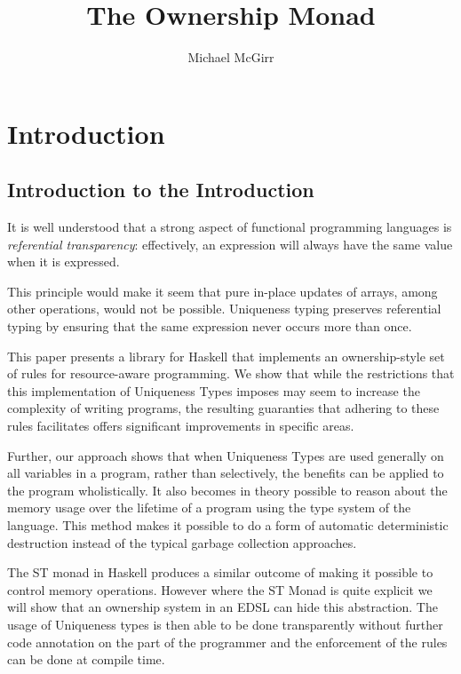 \documentclass[onehalf,11pt]{beavtex}
\title{The Ownership Monad}
\author{Michael McGirr}
\begin{document}
\maketitle

\mainmatter

\chapter{Introduction}
\section{Introduction to the Introduction}

It is well understood that a strong aspect of functional programming
languages is \textit{referential transparency}: effectively, an expression
will always have the same value when it is expressed. %

This principle would make it seem that pure in-place updates of arrays, among 
other operations, would not be possible. 
Uniqueness typing preserves referential typing by ensuring that the same
expression never occurs more than once.

This paper presents a library for Haskell that implements an
ownership-style set of rules for resource-aware programming.
We show that while the restrictions that this implementation of
Uniqueness Types imposes may seem to increase the complexity of
writing programs, the resulting guaranties that
adhering to these rules facilitates offers significant improvements in 
specific areas. 

Further, our approach shows that when Uniqueness Types are used generally
on all variables in a program, rather than selectively, the benefits can be
applied to the program wholistically.
It also becomes in theory possible to reason about the memory usage over the
lifetime of a program using the type system of the language. 
This method makes it possible to do a form of automatic deterministic destruction
instead of the typical garbage collection approaches.

The ST monad in Haskell produces a similar outcome of making it possible to
control memory operations.  However where the ST Monad is quite explicit
we will show that an ownership system in an EDSL can hide this abstraction.
The usage of Uniqueness types is then able to be done transparently without
further code annotation on the part of the programmer and the enforcement of
the rules can be done at compile time.
\end{document}
